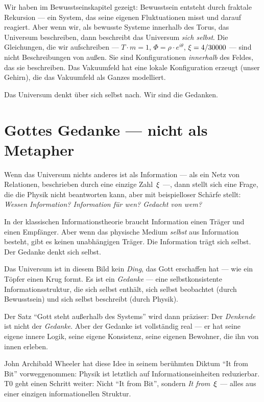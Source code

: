 Wir haben im Bewusstseinskapitel gezeigt: Bewusstsein entsteht durch fraktale Rekursion --- ein System, das seine eigenen Fluktuationen misst und darauf reagiert. Aber wenn wir, als bewusste Systeme innerhalb des Torus, das Universum beschreiben, dann beschreibt das Universum \emph{sich selbst}. Die Gleichungen, die wir aufschreiben --- $T \cdot m = 1$, $\Phi = \rho \cdot e^{i\theta}$, $\xi = 4/30000$ --- sind nicht Beschreibungen von außen. Sie sind Konfigurationen \emph{innerhalb} des Feldes, das sie beschreiben. Das Vakuumfeld hat eine lokale Konfiguration erzeugt (unser Gehirn), die das Vakuumfeld als Ganzes modelliert.

Das Universum denkt über sich selbst nach. Wir sind die Gedanken.

\section{Gottes Gedanke --- nicht als Metapher}

Wenn das Universum nichts anderes ist als Information --- als ein Netz von Relationen, beschrieben durch eine einzige Zahl~$\xi$ ---, dann stellt sich eine Frage, die die Physik nicht beantworten kann, aber mit beispielloser Schärfe stellt: \emph{Wessen Information? Information für wen? Gedacht von wem?}

In der klassischen Informationstheorie braucht Information einen Träger und einen Empfänger. Aber wenn das physische Medium \emph{selbst} aus Information besteht, gibt es keinen unabhängigen Träger. Die Information trägt sich selbst. Der Gedanke denkt sich selbst.

Das Universum ist in diesem Bild kein \emph{Ding}, das Gott erschaffen hat --- wie ein Töpfer einen Krug formt. Es ist ein \emph{Gedanke} --- eine selbstkonsistente Informationsstruktur, die sich selbst enthält, sich selbst beobachtet (durch Bewusstsein) und sich selbst beschreibt (durch Physik).

Der Satz \enquote{Gott steht außerhalb des Systems} wird dann präziser: Der \emph{Denkende} ist nicht der \emph{Gedanke}. Aber der Gedanke ist vollständig real --- er hat seine eigene innere Logik, seine eigene Konsistenz, seine eigenen Bewohner, die ihn von innen erleben.

John Archibald Wheeler hat diese Idee in seinem berühmten Diktum \enquote{It from Bit} vorweggenommen: Physik ist letztlich auf Informationseinheiten reduzierbar. T0 geht einen Schritt weiter: Nicht \enquote{It from Bit}, sondern \emph{It from~$\xi$} --- alles aus einer einzigen informationellen Struktur.

